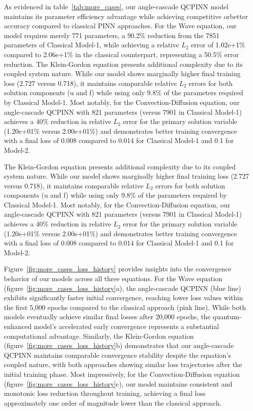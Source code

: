 As evidenced in table~\ref{tab:more_cases}, our angle-cascade QCPINN model maintains its parameter efficiency advantage while achieving competitive orbetter accuracy compared to classical PINN approaches. For the Wave equation, our model requires merely 771 parameters, a 90.2\% reduction from the 7851 parameters of Classical Model-1, while achieving a relative $L_2$ error of 1.02e+1\% compared to 2.06e+1\% in the classical counterpart, representing a 50.5\% error reduction.
The Klein-Gordon equation presents additional complexity due to its coupled system nature. While our model shows marginally higher final training loss (2.727 versus 0.718), it maintains comparable relative $L_2$ errors for both solution components (u and f) while using only 9.8\% of the parameters required by Classical Model-1.
Most notably, for the Convection-Diffusion equation, our angle-cascade QCPINN with 821 parameters (versus 7901 in Classical Model-1) achieves a 40\% reduction in relative $L_2$ error for the primary solution variable (1.20e+01\% versus 2.00e+01\%) and demonstrates better training convergence with a final loss of 0.008 compared to 0.014 for Classical Model-1 and 0.1 for Model-2.

The Klein-Gordon equation presents additional complexity due to its coupled system nature. While our model shows marginally higher final training loss (2.727 versus 0.718), it maintains comparable relative $L_2$  errors for both solution components (u and f) while using only 9.8\% of the parameters required by Classical Model-1.
Most notably, for the Convection-Diffusion equation, our angle-cascade QCPINN with 821 parameters (versus 7901 in Classical Model-1) achieves a 40\% reduction in relative $L_2$  error for the primary solution variable (1.20e+01\% versus 2.00e+01\%) and demonstrates better training convergence with a final loss of 0.008 compared to 0.014 for Classical Model-1 and 0.1 for Model-2.

Figure~\ref{fig:more_cases_loss_history} provides insights into the convergence behavior of our models across all three equations. For the Wave equation (figure~\ref{fig:more_cases_loss_history}a), the angle-cascade QCPINN (blue line) exhibits significantly faster initial convergence, reaching lower loss values within the first 5,000 epochs compared to the classical approach (pink line). While both models eventually achieve similar final losses after 20,000 epochs, the quantum-enhanced model's accelerated early convergence represents a substantial computational advantage.
Similarly, the Klein-Gordon equation (figure~\ref{fig:more_cases_loss_history}b) demonstrates that our angle-cascade QCPINN maintains comparable convergence stability despite the equation's coupled nature, with both approaches showing similar loss trajectories after the initial training phase. Most impressively, for the Convection-Diffusion equation (figure~\ref{fig:more_cases_loss_history}c), our model maintains consistent and monotonic loss reduction throughout training, achieving a final loss approximately one order of magnitude lower than the classical approach.

